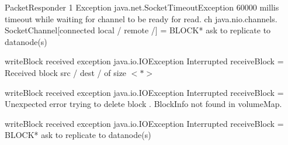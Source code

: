 \documentclass[12pt,a4paper]{article}
\begin{document}
	\noindent PacketResponder 1 Exception java.net.SocketTimeoutException 60000 millis timeout while waiting for channel to be ready for read. ch java.nio.channels. SocketChannel[connected local / remote /] = BLOCK* ask to replicate to datanode(s)
	
	\noindent writeBlock received exception java.io.IOException Interrupted receiveBlock = Received block src / dest / of size $<*>$
	
	\noindent writeBlock received exception java.io.IOException Interrupted receiveBlock = Unexpected error trying to delete block . BlockInfo not found in volumeMap.
	
	\noindent writeBlock received exception java.io.IOException Interrupted receiveBlock = BLOCK* ask to replicate to datanode(s)
	
\end{document}
